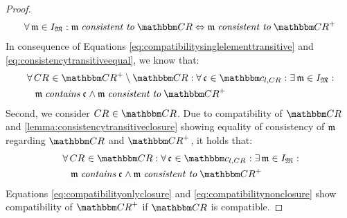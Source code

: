 \begin{proof}
\begin{align}
        \forall \modeltuple{m} \in \metamodeltupleinstanceset{M}: \modeltuple{m} \consistenttomath \consistencyrelationset{CR} \equivalent \modeltuple{m} \consistenttomath \transitiveclosure{\consistencyrelationset{CR}}
    \end{align}
    In consequence of Equations \ref{eq:compatibilitysinglelementtransitive} and \ref{eq:consistencytransitiveequal}, we know that:
    \begin{align}
        & \nonumber \label{eq:compatibilityonlyclosure}
        \forall \consistencyrelation{CR}{} \in \transitiveclosure{\consistencyrelationset{CR}} \setminus \consistencyrelationset{CR} : \forall \conditionelement{c}{} \in \condition{c}{l, \consistencyrelation{CR}{}}
        : \exists \modeltuple{m} \in \metamodeltupleinstanceset{M} : \\
        & \formulaskip
        \modeltuple{m} \containsmath \conditionelement{c}{} \land \modeltuple{m} \consistenttomath \transitiveclosure{\consistencyrelationset{CR}}
    \end{align}
    Second, we consider $\consistencyrelation{CR}{} \in \consistencyrelationset{CR}$.
    Due to compatibility of $\consistencyrelationset{CR}$ and \autoref{lemma:consistencytransitiveclosure} showing equality of consistency of $\modeltuple{m}$ regarding $\consistencyrelationset{CR}$ and $\transitiveclosure{\consistencyrelationset{CR}}$, it holds that:
    \begin{align}
        & \nonumber \label{eq:compatibilitynonclosure}
        \forall \consistencyrelation{CR}{} \in \consistencyrelationset{CR} : \forall \conditionelement{c}{} \in \condition{c}{l, \consistencyrelation{CR}{}}
        : \exists \modeltuple{m} \in \metamodeltupleinstanceset{M} : \\
        & \formulaskip
        \modeltuple{m} \containsmath \conditionelement{c}{} \land \modeltuple{m} \consistenttomath \transitiveclosure{\consistencyrelationset{CR}}
    \end{align}
    Equations \ref{eq:compatibilityonlyclosure} and \ref{eq:compatibilitynonclosure} show compatibility of $\transitiveclosure{\consistencyrelationset{CR}}$ if $\consistencyrelationset{CR}$ is compatible.
\end{proof}
